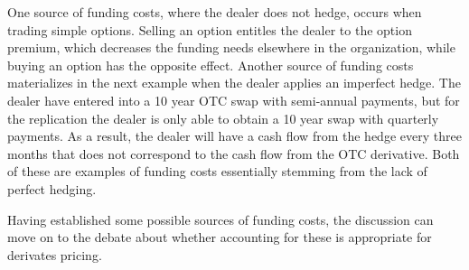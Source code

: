 \documentclass[../../../main.tex]{subfiles}
\begin{document}
        One source of funding costs, where the dealer does not hedge, occurs when trading simple options.
        Selling an option entitles the dealer to the option premium,
        which decreases the funding needs elsewhere in the organization,
        while buying an option has the opposite effect. 
        Another source of funding costs materializes in the next example when the dealer applies an imperfect hedge.
        The dealer have entered into a 10 year OTC swap with semi-annual payments, 
        but for the replication the dealer is only able to obtain a 10 year swap with quarterly payments.
        As a result, the dealer will have a cash flow from the hedge every three months
        that does not correspond to the cash flow from the OTC derivative. 
        Both of these are examples of funding costs essentially stemming from the lack of perfect hedging.

        Having established some possible sources of funding costs, 
        the discussion can move on to the debate about whether accounting for these is appropriate for derivates pricing.
\end{document}
